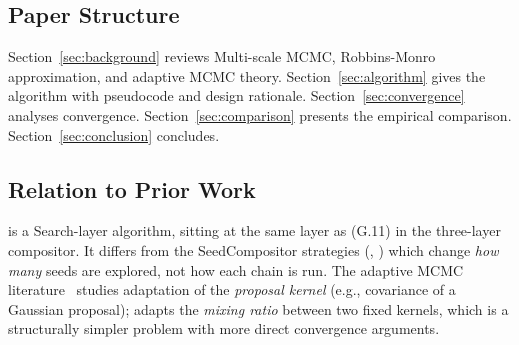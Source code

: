 \subsection{Paper Structure}

Section~\ref{sec:background} reviews Multi-scale MCMC, Robbins-Monro
approximation, and adaptive MCMC theory.
Section~\ref{sec:algorithm} gives the \ams{} algorithm with pseudocode and
design rationale.
Section~\ref{sec:convergence} analyses convergence.
Section~\ref{sec:comparison} presents the empirical comparison.
Section~\ref{sec:conclusion} concludes.

\subsection{Relation to Prior Work}

\ams{} is a Search-layer algorithm, sitting at the same layer as \ms{} (G.11)
in the three-layer compositor.
It differs from the SeedCompositor strategies (\cs{}, \be{}) which change
\emph{how many} seeds are explored, not how each chain is run.
The adaptive MCMC literature~\citep{haario2001, andrieu2008} studies
adaptation of the \emph{proposal kernel} (e.g., covariance of a Gaussian
proposal); \ams{} adapts the \emph{mixing ratio} between two fixed kernels,
which is a structurally simpler problem with more direct convergence arguments.
